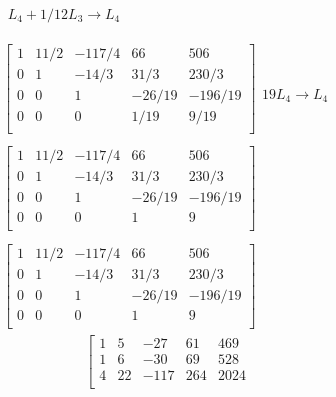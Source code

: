 \documentclass[]{article}
\begin{document}
\[\begin{array}{l}
\begin{array}{l}
 L_{4} + 1/12 L_{3} \rightarrow L_{4} \\ 
\end{array}\\
 \\
\left[
\begin{array}{rrrr|r}
1 & 11/2 & -117/4 & 66 & 506 \\ 
0 & 1 & -14/3 & 31/3 & 230/3 \\ 
0 & 0 & 1 & -26/19 & -196/19 \\ 
0 & 0 & 0 & 1/19 & 9/19 \\ 
\end{array}
\right]\begin{array}{l}
\\ 
\\ 
\\ 
19 L_{4} \rightarrow L_{4}\\ 
\end{array}\\
 \\
\left[
\begin{array}{rrrr|r}
1 & 11/2 & -117/4 & 66 & 506 \\ 
0 & 1 & -14/3 & 31/3 & 230/3 \\ 
0 & 0 & 1 & -26/19 & -196/19 \\ 
0 & 0 & 0 & 1 & 9 \\ 
\end{array}
\right]\begin{array}{l}
\\ 
\\ 
\\ 
\\ 
\end{array}\\
 \\
\left[
\begin{array}{rrrr|r}
1 & 11/2 & -117/4 & 66 & 506 \\ 
0 & 1 & -14/3 & 31/3 & 230/3 \\ 
0 & 0 & 1 & -26/19 & -196/19 \\ 
0 & 0 & 0 & 1 & 9 \\ 
\end{array}
\right]
\end{array}
\]\[
\begin{array}{l}
\left[
\begin{array}{rrrr|r}
1 & 5 & -27 & 61 & 469 \\ 
1 & 6 & -30 & 69 & 528 \\ 
4 & 22 & -117 & 264 & 2024 \\ 

\end{array}
\end{array}\]
\end{document}
